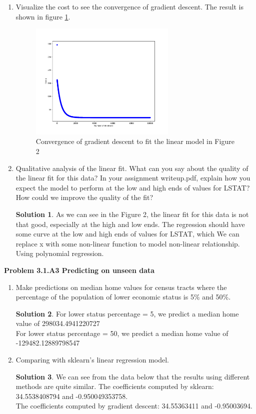 \documentclass[]{book}
\theoremstyle{definition}
\newtheorem*{soln}{Solution}
\begin{document}
\begin{enumerate}
\item
	Visualize the cost to see the convergence of gradient descent. The result is shown in figure \ref{fig:3}. 
	\begin{figure}[H]
		\centering
		\includegraphics[width=7cm]{fig2b.pdf}
		\caption{Convergence of gradient descent to fit the linear model in Figure 2}
		\label{fig:3}
	\end{figure} 



	\item Qualitative analysis of the linear fit. What can you say about the quality of the linear fit for this data? In your assignment writeup.pdf, explain how you expect the model to perform at the low and high ends of values for LSTAT? How could we improve the quality of the fit?
	\begin{soln}
		As we can see in the Figure 2, the linear fit for this data is not that good, especially at the high and low ends. The regression should have some curve at the low and high ends of values for LSTAT, which We can replace x with some non-linear function to model non-linear relationship. Using polynomial regression. 
	\end{soln}
	
\end{enumerate}
\textbf{Problem 3.1.A3 Predicting on unseen data}
\begin{enumerate}
	\item Make predictions on median home values for census tracts where the percentage of the population of lower economic status is 5\% and 50\%.
	\begin{soln}
		For lower status percentage = 5, we predict a median home value of 298034.4941220727\\
		For lower status percentage = 50, we predict a median home value of -129482.12889798547
	\end{soln}
	\item Comparing with sklearn's linear regression model.
	\begin{soln} We can see from the data below that the results using different methods are quite similar.
		The coefficients computed by sklearn:  34.5538408794  and  -0.950049353758. \\
		The coefficients computed by gradient descent:  34.55363411 and -0.95003694.
	\end{soln}

\end{enumerate}
\end{document}
